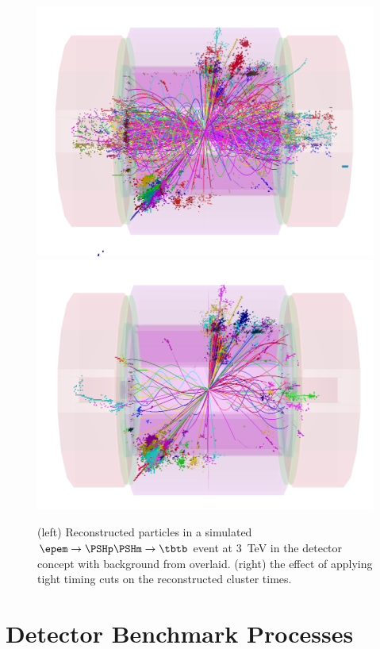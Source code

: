 \begin{figure}[hbt]
\centering
\includegraphics[width=0.49\linewidth]{../Chap3_ExpCond_PhysPerfsReqs/HH2.pdf}
\includegraphics[width=0.49\linewidth]{../Chap3_ExpCond_PhysPerfsReqs/HH2tight.pdf}
\caption{(left) Reconstructed particles in a simulated $\epem\rightarrow\PSHp\PSHm\rightarrow \tbtb$ event at 3~TeV in the \clicild detector concept with background from \gghadrons overlaid. (right) the effect of applying tight timing cuts on the reconstructed cluster times. \label{fig:chap3:eventDisplays}}
\end{figure}


\section{Detector Benchmark Processes\label{sec:chapter3:benchmarks}}


